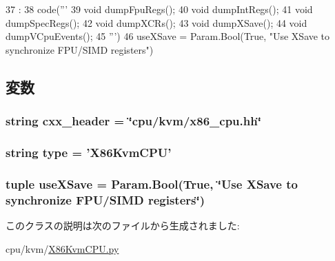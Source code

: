 \begin{DoxyCode}
37                                  :
38         code('''
39       void dumpFpuRegs();
40       void dumpIntRegs();
41       void dumpSpecRegs();
42       void dumpXCRs();
43       void dumpXSave();
44       void dumpVCpuEvents();
45 ''')
46 
    useXSave = Param.Bool(True, "Use XSave to synchronize FPU/SIMD registers")
\end{DoxyCode}


\subsection{変数}
\hypertarget{classX86KvmCPU_1_1X86KvmCPU_a17da7064bc5c518791f0c891eff05fda}{
\subsubsection[{cxx\_\-header}]{\setlength{\rightskip}{0pt plus 5cm}string {\bf cxx\_\-header} = \char`\"{}cpu/kvm/x86\_\-cpu.hh\char`\"{}}}
\label{classX86KvmCPU_1_1X86KvmCPU_a17da7064bc5c518791f0c891eff05fda}
\hypertarget{classX86KvmCPU_1_1X86KvmCPU_acce15679d830831b0bbe8ebc2a60b2ca}{
\subsubsection[{type}]{\setlength{\rightskip}{0pt plus 5cm}string {\bf type} = '{\bf X86KvmCPU}'}}
\label{classX86KvmCPU_1_1X86KvmCPU_acce15679d830831b0bbe8ebc2a60b2ca}
\hypertarget{classX86KvmCPU_1_1X86KvmCPU_a3725b3e743931bddb52ab58aa1eabe2d}{
\subsubsection[{useXSave}]{\setlength{\rightskip}{0pt plus 5cm}tuple {\bf useXSave} = Param.Bool(True, \char`\"{}Use XSave to synchronize FPU/SIMD registers\char`\"{})}}
\label{classX86KvmCPU_1_1X86KvmCPU_a3725b3e743931bddb52ab58aa1eabe2d}


このクラスの説明は次のファイルから生成されました:\begin{DoxyCompactItemize}
\item 
cpu/kvm/\hyperlink{X86KvmCPU_8py}{X86KvmCPU.py}\end{DoxyCompactItemize}
